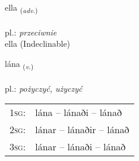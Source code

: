 \documentclass[frontgrid, backgrid]{flacards}\usepackage[]{graphicx}\usepackage[]{xcolor}
\begin{document}

\renewcommand{\flhead}{\vskip5pt \fboxsep=0pt {\small\bfseries\footnotesize Atviksorð | Adverb}}
\renewcommand{\fcfoot}{\vskip5pt \fboxsep=0pt \hspace{2pt}{\small\bfseries\footnotesize 2K}}

\renewcommand{\blhead}{\vskip5pt {\small\bfseries\footnotesize Atviksorð | Adverb }}
\renewcommand{\bcfoot}{\vskip5pt \hspace{2pt}{\small\bfseries\footnotesize 2K}}


{ella \small{\textsubscript{(\textit{adv.})}} \\[1ex]
\textphonetic{[ɛtla]} \\
pl.: \emph{przeciwnie} \\  [2ex]
ella (Indeclinable)}

\renewcommand{\flhead}{\vskip5pt \fboxsep=0pt {\small\bfseries\footnotesize Sagnorð | Verb}}
\renewcommand{\fcfoot}{\vskip5pt \fboxsep=0pt \hspace{2pt}{\small\bfseries\footnotesize 2K}}

\renewcommand{\blhead}{\vskip5pt {\small\bfseries\footnotesize Sagnorð | Verb }}
\renewcommand{\bcfoot}{\vskip5pt \hspace{2pt}{\small\bfseries\footnotesize 2K}}


{lána \small{\textsubscript{(\textit{v.})}} \\[1ex] %
\textphonetic{[lauːna]} \\
pl.: \emph{pożyczyć, użyczyć} \\  [2ex]
\renewcommand*{\arraystretch}{0.8}
\begin{tabular}{p{1cm}l}
\textsc{1sg}: & lána -- lánaði -- lánað \\ 
\textsc{2sg}: & lánar -- lánaðir -- lánað \\ 
\textsc{3sg}: & lánar -- lánaði -- lánað \\ 
\end{tabular}
}

\renewcommand{\flhead}{\vskip5pt \fboxsep=0pt {\small\bfseries\footnotesize Sagnorð | Verb}}
\renewcommand{\fcfoot}{\vskip5pt \fboxsep=0pt \hspace{2pt}{\small\bfseries\footnotesize 2K}}
\end{document}
